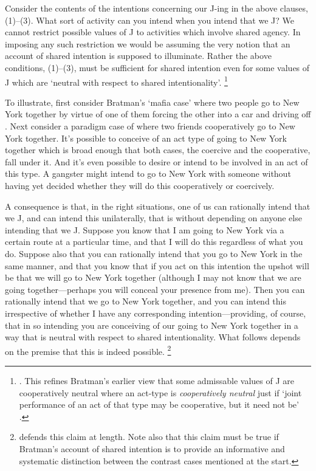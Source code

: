 \documentclass[12pt,\papersize]{extarticle}
\begin{document}
Consider the contents of the intentions concerning our J-ing in the above clauses, (1)--(3). 
What sort of activity can you intend when you intend that we J?
We cannot restrict possible values of J to activities which involve shared agency.
In imposing any such restriction we would be assuming the very notion that an account of shared intention is supposed to illuminate. 
%
Rather the above  conditions, (1)--(3), must be sufficient for shared intention even for some values of J which are `neutral with respect to shared intentionality'.%
\footnote{
 \citet[p.\ 147]{Bratman:1999fr}.
 This refines Bratman's earlier view that some admissable values of J are cooperatively neutral 
 	where an  act-type is \emph{cooperatively neutral} just if `joint performance of an act of that type may be cooperative, but it need not be' \citep[p.\ 330]{Bratman:1992mi}. 
}

To illustrate, first consider Bratman's `mafia case' where two people go to New York together by virtue of one of them forcing the other into a car and driving off \citep[p.\ 333]{Bratman:1992mi}. 
Next consider a paradigm case of where two friends cooperatively go to New York together.
It's possible to conceive of an act type of going to New York together which is broad enough that both cases, the coercive and the cooperative, fall under it.
And it's even possible to desire or intend to be involved in an act of this type.
A gangster might intend to go to New York with someone without having yet decided whether they will do this cooperatively or coercively.

A consequence is that, in the right situations, one of us can rationally intend that we J, and can intend this unilaterally, that is without depending on anyone else intending that we J. 
Suppose you know that I am going to New York via a certain route at a particular time, 
and that I will do this regardless of what you do.
Suppose also that you can rationally intend that you go to New York in the same manner,
and that you know that if you act on this intention the upshot will be that we will go to New York together (although I may not know that we are going together---perhaps you will conceal your presence from me).
Then you can rationally intend that we go to New York together, 
	and you can intend this irrespective of whether I have any corresponding intention---providing, of course, that in so intending you are conceiving of our going to New York together in a way that is neutral with respect to shared intentionality.
What follows depends on the premise that this is indeed possible.%
\footnote{ 
\citet{Bratman:1999fr}  defends this claim at length. 
Note also that this claim must be true if Bratman's account of shared intention is to provide an informative and systematic distinction between the contrast cases mentioned at the start.
}
\end{document}
